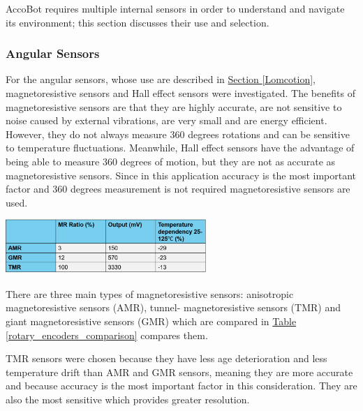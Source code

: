 \documentclass[11pt]{article}		%
\newcommand{\tableref}[1]{\hyperref[#1]{Table \ref*{#1}}}     %
\newcommand{\sectref}[1]{\hyperref[#1]{Section \ref*{#1}}}     %
\begin{document}
		AccoBot requires multiple internal sensors in order to understand and navigate its environment; this section discusses their use and selection.
		
		\subsubsection{Angular Sensors}
            		
       For the angular sensors, whose use are described in \sectref{Lomcotion}, magnetoresistive sensors and Hall effect sensors were investigated. The benefits of magnetoresistive sensors are that they are highly accurate, are not sensitive to noise caused by external vibrations, are very small and are energy efficient. However, they do not always measure 360 degrees rotations and can be sensitive to temperature fluctuations. Meanwhile, Hall effect sensors have the advantage of being able to measure 360 degrees of motion, but they are not as accurate as magnetoresistive sensors. Since in this application accuracy is the most important factor and 360 degrees measurement is not required magnetoresistive sensors are used.
           \begin{floatingfigure}[r]{0.6\textwidth}
					\centering
					\includegraphics[width=0.57\textwidth] {AMR_comparison table_formatted}
					\label{rotary_encoders_comparison}
			\end{floatingfigure}
            \hspace*{2ex}There are three main types of magnetoresistive sensors: anisotropic magnetoresistive sensors (AMR), tunnel- magnetoresistive sensors (TMR) and giant magnetoresistive sensors (GMR) which are compared in \tableref{rotary_encoders_comparison} compares them.
            \begin{floatingfigure}[r]{0pt} \end{floatingfigure}
\hspace*{2ex}TMR sensors were chosen because they have less age deterioration and less temperature drift than AMR and GMR sensors, meaning they are more accurate and because accuracy is the most important factor in this consideration. They are also the most sensitive which provides greater resolution.
\end{document}

